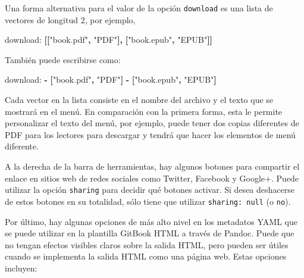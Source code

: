 \documentclass[12pt,]{krantz}
\makeatletter
\newenvironment{Shaded}{\begin{snugshade}}{\end{snugshade}}
\newcommand{\KeywordTok}[1]{\textcolor[rgb]{0.13,0.29,0.53}{\textbf{{#1}}}}
\newcommand{\StringTok}[1]{\textcolor[rgb]{0.31,0.60,0.02}{{#1}}}
\newcommand{\FunctionTok}[1]{\textcolor[rgb]{0.00,0.00,0.00}{{#1}}}
\newenvironment{kframe}{%
\medskip{}
\setlength{\fboxsep}{.8em}
 \def\at@end@of@kframe{}%
 \ifinner\ifhmode%
  \def\at@end@of@kframe{\end{minipage}}%
  \begin{minipage}{\columnwidth}%
 \fi\fi%
 \def\FrameCommand##1{\hskip\@totalleftmargin \hskip-\fboxsep
 \colorbox{shadecolor}{##1}\hskip-\fboxsep
     \hskip-\linewidth \hskip-\@totalleftmargin \hskip\columnwidth}%
 \MakeFramed {\advance\hsize-\width
   \@totalleftmargin\z@ \linewidth\hsize
   \@setminipage}}%
 {\par\unskip\endMakeFramed%
 \at@end@of@kframe}
\renewenvironment{Shaded}{\begin{kframe}}{\end{kframe}}
\theoremstyle{definition}
\theoremstyle{definition}
\theoremstyle{remark}
\makeatother
\begin{document}
Una forma alternativa para el valor de la opción \texttt{download} es
una lista de vectores de longitud 2, por ejemplo,

\begin{Shaded}
\begin{Highlighting}[]
    \FunctionTok{download:} \KeywordTok{[[}\StringTok{"book.pdf"}\KeywordTok{,} \StringTok{"PDF"}\KeywordTok{],} \KeywordTok{[}\StringTok{"book.epub"}\KeywordTok{,} \StringTok{"EPUB"}\KeywordTok{]]}
\end{Highlighting}
\end{Shaded}

También puede escribirse como:

\begin{Shaded}
\begin{Highlighting}[]
    \FunctionTok{download:}
      \KeywordTok{-} \KeywordTok{[}\StringTok{"book.pdf"}\KeywordTok{,} \StringTok{"PDF"}\KeywordTok{]}
      \KeywordTok{-} \KeywordTok{[}\StringTok{"book.epub"}\KeywordTok{,} \StringTok{"EPUB"}\KeywordTok{]}
\end{Highlighting}
\end{Shaded}

Cada vector en la lista consiste en el nombre del archivo y el texto que
se mostrará en el menú. En comparación con la primera forma, esta le
permite personalizar el texto del menú, por ejemplo, puede tener dos
copias diferentes de PDF para los lectores para descargar y tendrá que
hacer los elementos de menú diferente.

A la derecha de la barra de herramientas, hay algunos botones para
compartir el enlace en sitios web de redes sociales como Twitter,
Facebook y Google+. Puede utilizar la opción \texttt{sharing} para
decidir qué botones activar. Si desea deshacerse de estos botones en su
totalidad, sólo tiene que utilizar \texttt{sharing:\ null} (o
\texttt{no}).

Por último, hay algunas opciones de más alto nivel en los metadatos YAML
que se puede utilizar en la plantilla GitBook HTML a través de Pandoc.
Puede que no tengan efectos visibles claros sobre la salida HTML, pero
pueden ser útiles cuando se implementa la salida HTML como una página
web. Estas opciones incluyen:
\end{document}
